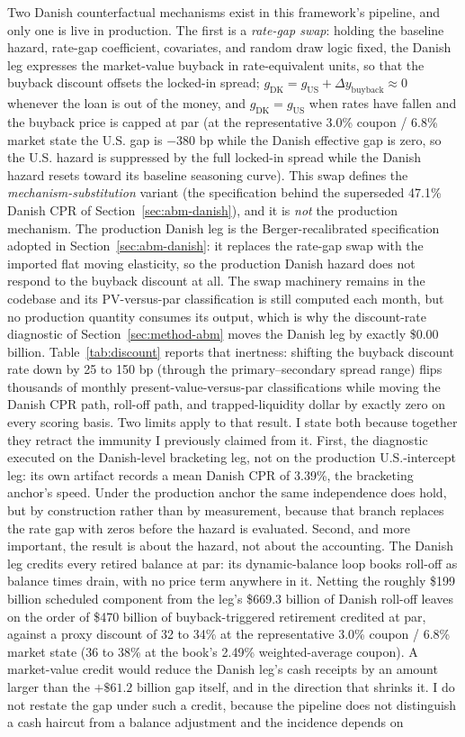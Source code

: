 \documentclass[12pt]{article}
\begin{document}
Two Danish counterfactual mechanisms exist in this framework's pipeline, and only one is live in production. The first is a \emph{rate-gap swap}: holding the baseline hazard, rate-gap coefficient, covariates, and random draw logic fixed, the Danish leg expresses the market-value buyback in rate-equivalent units, so that the buyback discount offsets the locked-in spread; $g_{\mathrm{DK}} = g_{\mathrm{US}} + \Delta y_{\mathrm{buyback}} \approx 0$ whenever the loan is out of the money, and $g_{\mathrm{DK}} = g_{\mathrm{US}}$ when rates have fallen and the buyback price is capped at par (at the representative 3.0\% coupon / 6.8\% market state the U.S. gap is $-380$ bp while the Danish effective gap is zero, so the U.S. hazard is suppressed by the full locked-in spread while the Danish hazard resets toward its baseline seasoning curve). This swap defines the \emph{mechanism-substitution} variant (the specification behind the superseded 47.1\% Danish CPR of Section~\ref{sec:abm-danish}), and it is \emph{not} the production mechanism. The production Danish leg is the Berger-recalibrated specification adopted in Section~\ref{sec:abm-danish}: it replaces the rate-gap swap with the imported flat moving elasticity, so the production Danish hazard does not respond to the buyback discount at all. The swap machinery remains in the codebase and its PV-versus-par classification is still computed each month, but no production quantity consumes its output, which is why the discount-rate diagnostic of Section~\ref{sec:method-abm} moves the Danish leg by exactly \$0.00 billion. Table~\ref{tab:discount} reports that inertness: shifting the buyback discount rate down by 25 to 150 bp (through the primary--secondary spread range) flips thousands of monthly present-value-versus-par classifications while moving the Danish CPR path, roll-off path, and trapped-liquidity dollar by exactly zero on every scoring basis. Two limits apply to that result. I state both because together they retract the immunity I previously claimed from it. First, the diagnostic executed on the Danish-level bracketing leg, not on the production U.S.-intercept leg: its own artifact records a mean Danish CPR of 3.39\%, the bracketing anchor's speed. Under the production anchor the same independence does hold, but by construction rather than by measurement, because that branch replaces the rate gap with zeros before the hazard is evaluated. Second, and more important, the result is about the hazard, not about the accounting. The Danish leg credits every retired balance at par: its dynamic-balance loop books roll-off as balance times drain, with no price term anywhere in it. Netting the roughly \$199 billion scheduled component from the leg's \$669.3 billion of Danish roll-off leaves on the order of \$470 billion of buyback-triggered retirement credited at par, against a proxy discount of 32 to 34\% at the representative 3.0\% coupon / 6.8\% market state (36 to 38\% at the book's 2.49\% weighted-average coupon). A market-value credit would reduce the Danish leg's cash receipts by an amount larger than the $+\$61.2$ billion gap itself, and in the direction that shrinks it. I do not restate the gap under such a credit, because the pipeline does not distinguish a cash haircut from a balance adjustment and the incidence depends on 
\end{document}
